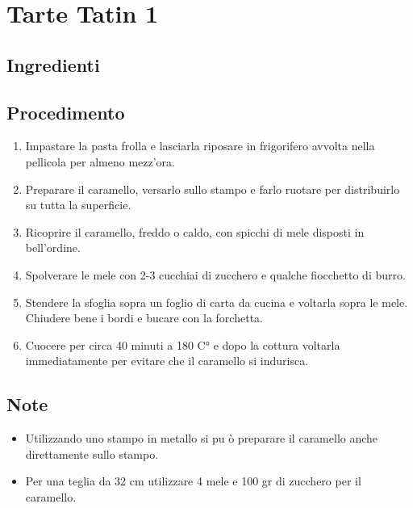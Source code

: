 \section{Tarte Tatin 1}
\subsection{Ingredienti}
\subsection{Procedimento}
\begin{enumerate}
\item  Impastare la pasta frolla e lasciarla riposare in frigorifero avvolta nella pellicola per almeno mezz'ora.  
\item  Preparare il caramello, versarlo sullo stampo e farlo ruotare per distribuirlo su tutta la superficie.  
\item  Ricoprire il caramello, freddo o caldo, con spicchi di mele disposti in bell'ordine.  
\item  Spolverare le mele con 2-3 cucchiai di zucchero e qualche fiocchetto di burro.  
\item  Stendere la sfoglia sopra un foglio di carta da cucina e voltarla sopra le mele. Chiudere bene i bordi e bucare con la forchetta.   
\item  Cuocere per circa 40 minuti a 180 C° e dopo la cottura voltarla immediatamente per evitare che il caramello si indurisca.
\end{enumerate}
\subsection{Note}
\begin{itemize}
\item Utilizzando uno stampo in metallo si pu ò preparare il caramello anche direttamente sullo stampo.  
\item Per una teglia da 32 cm utilizzare 4 mele e 100 gr di zucchero per il caramello.
\end{itemize}
